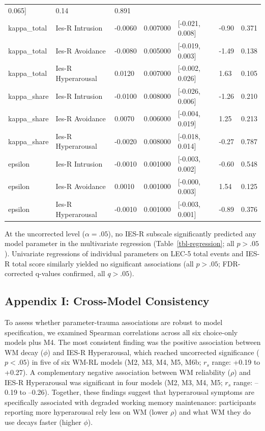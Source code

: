 \documentclass{article}
\begin{document}
\begin{longtable}[]{@{}lllllll@{}}
0.065{]} & 0.14 & 0.891 \\
kappa\_total & Ies-R Intrusion & -0.0060 & 0.007000 & {[}-0.021,
0.008{]} & -0.90 & 0.371 \\
kappa\_total & Ies-R Avoidance & -0.0080 & 0.005000 & {[}-0.019,
0.003{]} & -1.49 & 0.138 \\
kappa\_total & Ies-R Hyperarousal & 0.0120 & 0.007000 & {[}-0.002,
0.026{]} & 1.63 & 0.105 \\
kappa\_share & Ies-R Intrusion & -0.0100 & 0.008000 & {[}-0.026,
0.006{]} & -1.26 & 0.210 \\
kappa\_share & Ies-R Avoidance & 0.0070 & 0.006000 & {[}-0.004, 0.019{]}
& 1.25 & 0.213 \\
kappa\_share & Ies-R Hyperarousal & -0.0020 & 0.008000 & {[}-0.018,
0.014{]} & -0.27 & 0.787 \\
epsilon & Ies-R Intrusion & -0.0010 & 0.001000 & {[}-0.003, 0.002{]} &
-0.60 & 0.548 \\
epsilon & Ies-R Avoidance & 0.0010 & 0.001000 & {[}-0.000, 0.003{]} &
1.54 & 0.125 \\
epsilon & Ies-R Hyperarousal & -0.0010 & 0.001000 & {[}-0.003, 0.001{]}
& -0.89 & 0.376 \\

\end{longtable}

At the uncorrected level (\(\alpha = .05\)), no IES-R subscale
significantly predicted any model parameter in the multivariate
regression (Table~\ref{tbl-regression}; all \(p > .05\)). Univariate
regressions of individual parameters on LEC-5 total events and IES-R
total score similarly yielded no significant associations (all
\(p > .05\); FDR-corrected q-values confirmed, all \(q > .05\)).

\subsection{Appendix I: Cross-Model Consistency}\label{sec-cross-model}

To assess whether parameter-trauma associations are robust to model
specification, we examined Spearman correlations across all six
choice-only models plus M4. The most consistent finding was the positive
association between WM decay (\(\phi\)) and IES-R Hyperarousal, which
reached uncorrected significance (\(p < .05\)) in five of six WM-RL
models (M2, M3, M4, M5, M6b; \(r_s\) range: +0.19 to +0.27). A
complementary negative association between WM reliability (\(\rho\)) and
IES-R Hyperarousal was significant in four models (M2, M3, M4, M5;
\(r_s\) range: --0.19 to --0.26). Together, these findings suggest that
hyperarousal symptoms are specifically associated with degraded working
memory maintenance: participants reporting more hyperarousal rely less
on WM (lower \(\rho\)) and what WM they do use decays faster (higher
\(\phi\)).
\end{document}
